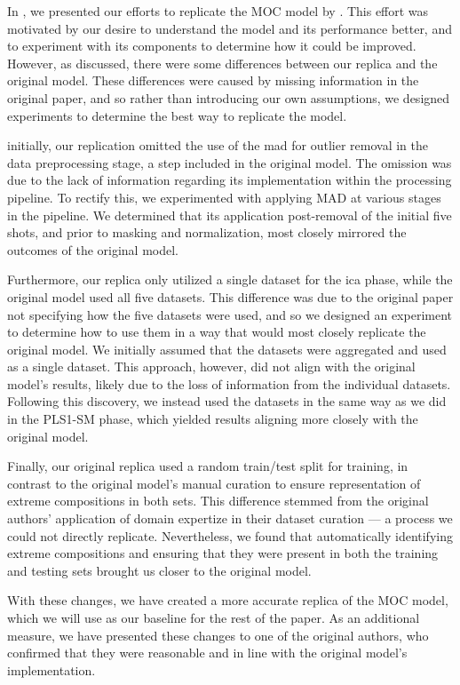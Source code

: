 In \citet{p9_paper}, we presented our efforts to replicate the MOC model by \citet{cleggRecalibrationMarsScience2017}.
This effort was motivated by our desire to understand the model and its performance better, and to experiment with its components to determine how it could be improved.
However, as discussed, there were some differences between our replica and the original model.
These differences were caused by missing information in the original paper, and so rather than introducing our own assumptions, we designed experiments to determine the best way to replicate the model.

initially, our replication omitted the use of the \gls{mad} for outlier removal in the data preprocessing stage, a step included in the original model.
The omission was due to the lack of information regarding its implementation within the processing pipeline.
To rectify this, we experimented with applying MAD at various stages in the pipeline.
We determined that its application post-removal of the initial five shots, and prior to masking and normalization, most closely mirrored the outcomes of the original model.

Furthermore, our replica only utilized a single dataset for the \gls{ica} phase, while the original model used all five datasets.
This difference was due to the original paper not specifying how the five datasets were used, and so we designed an experiment to determine how to use them in a way that would most closely replicate the original model.
We initially assumed that the datasets were aggregated and used as a single dataset.
This approach, however, did not align with the original model's results, likely due to the loss of information from the individual datasets.
Following this discovery, we instead used the datasets in the same way as we did in the \gls{PLS1-SM} phase, which yielded results aligning more closely with the original model.

Finally, our original replica used a random train/test split for training, in contrast to the original model's manual curation to ensure representation of extreme compositions in both sets.
This difference stemmed from the original authors' application of domain expertize in their dataset curation --- a process we could not directly replicate.
Nevertheless, we found that automatically identifying extreme compositions and ensuring that they were present in both the training and testing sets brought us closer to the original model.

With these changes, we have created a more accurate replica of the MOC model, which we will use as our baseline for the rest of the paper.
As an additional measure, we have presented these changes to one of the original authors, who confirmed that they were reasonable and in line with the original model's implementation.

